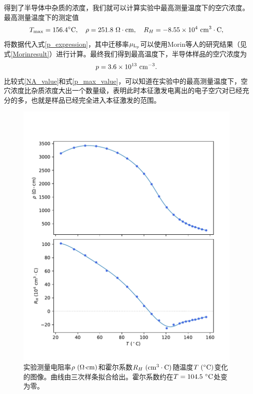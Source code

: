 \documentclass[font=default]{mpltx}
\begin{document}
得到了半导体中杂质的浓度，我们就可以计算实验中最高测量温度下的空穴浓度。最高测量温度下的测定值$$T_{\max}=156.4^\circ{\rm C},\quad \rho=251.8\ \Omega\cdot{\rm cm},\quad R_H=-8.55\times10^4\ {\rm cm^3\cdot C},$$将数据代入式\ref{p_expression}，其中迁移率$\mu_{\rm L_p}$可以使用Morin等人的研究结果（见式\ref{Morinresult}）进行计算。最终我们得到最高温度下，半导体样品的空穴浓度为\begin{equation}\label{p_max_value}p=3.6\times10^{13}\ {\rm cm^{-3}}.\end{equation}
比较式\ref{NA_value}和式\ref{p_max_value}，可以知道在实验中的最高测量温度下，空穴浓度比杂质浓度大出一个数量级，表明此时本征激发电离出的电子空穴对已经充分的多，也就是样品已经完全进入本征激发的范围。
\begin{figure}[h]
  \centering
  \setlength{\abovecaptionskip}{-0.4cm}
  \includegraphics[width=0.8\linewidth]{fig/T_rho_RH.pdf}
  \caption{实验测量电阻率$\rho\ (\Omega{\rm \cdot cm})$和霍尔系数$R_H\ ({\rm cm^3\cdot C})$随温度$T\ ({\rm ^\circ C})$变化的图像。曲线由三次样条拟合给出。霍尔系数约在$T=104.5\ {\rm ^\circ C}$处变为零。}
  \label{T_rho_RH}
\end{figure}
\end{document}
